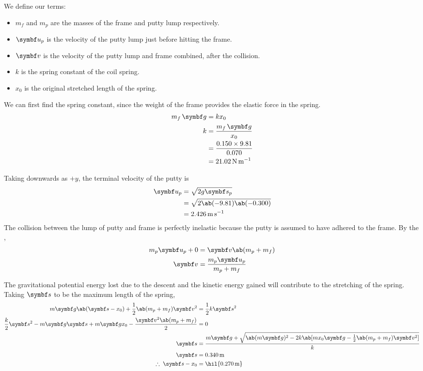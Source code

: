 We define our terms:
\begin{itemize}
  \item \(m_f\) and \(m_p\) are the masses of the frame and putty
    lump respectively.
  \item \(\mv{u}_p\) is the velocity of the putty lump just before
    hitting the frame.
  \item \(\mv{v}\) is the velocity of the putty lump and frame
    combined, after the collision.
  \item \(k\) is the spring constant of the coil spring.
  \item \(x_0\) is the original stretched length of the spring.
\end{itemize}

We can first find the spring constant, since the weight of the frame
provides the elastic force in the spring.
\begin{align*}
  m_f\,\mv{g} &= kx_0 \\
  k &= \f{m_f\,\mv{g}}{x_0} \\
  &= \f{0.150\times 9.81}{0.070} \\
  &= \qty{21.02}{\newton\per\metre}
\end{align*}

Taking downwards as \(+y\), the terminal velocity of the putty is
\begin{align*}
  \mv{u}_p &= \sqrt{2g\mv{s}_p} \\
  &= \sqrt{2\ab(-9.81)\ab(-0.300)} \\
  &= \qty{2.426}{\metre\per\second}
\end{align*}
The collision between the lump of putty and frame is perfectly
inelastic because the putty is assumed to
have adhered to the frame. By the ,
\begin{align*}
  m_p\mv{u}_p + 0 &= \mv{v}\ab(m_p + m_f) \\
  \mv{v} &= \f{m_p\mv{u}_p}{m_p + m_f}
\end{align*}

The gravitational potential energy lost due to the descent and the
kinetic energy
gained will contribute to the stretching of the spring. Taking \(\mv{s}\) to be
the maximum length of the spring,
\begin{align*}
  m\mv{g}\ab(\mv{s}-x_0) + \f{1}{2}\ab(m_p + m_f)\mv{v}^2 &=
  \f{1}{2}k\mv{s}^2 \\
  \f{k}{2}\mv{s}^2 - m\mv{g}\mv{s} + m\mv{g}x_0 -
  \f{\mv{v}^2\ab(m_p+m_f)}{2} &= 0 \\
  \mv{s} &= \f{m\mv{g} + \sqrt{\ab(m\mv{g})^2 - 2k\ab[mx_0\mv{g} -
  \f{1}{2}\ab(m_p + m_f)\mv{v}^2]}}{k} \\
  \mv{s} &= \qty{0.340}{\metre} \\
  \therefore\;\mv{s} - x_0 &= \hil{\qty{0.270}{\metre}}
\end{align*}

